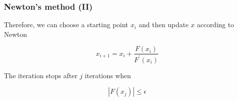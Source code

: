 \documentclass[hyperref={colorlinks=true}]{beamer}
\begin{document}

\begin{frame}%
  \frametitle{Newton's method (II)}

  Therefore, we can choose a starting point $x_i$ and then update $x$ according to Newton
  
  \mysp
  
  \begin{equation}
    x_{i+1} = x_{i} + \frac{F(x_i)}{F^{\prime}(x_i)}
  \end{equation}
  
  The iteration stops after $j$ iterations when 
  
  \begin{equation}
   | F(x_{j}) | \leq \epsilon
  \end{equation}  
\end{frame}

\end{document}
